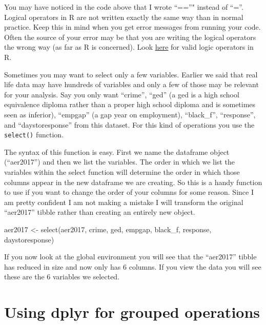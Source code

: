 \documentclass[
]{book}
\newenvironment{Shaded}{\begin{snugshade}}{\end{snugshade}}
\newcommand{\FunctionTok}[1]{\textcolor[rgb]{0.00,0.00,0.00}{#1}}
\newcommand{\NormalTok}[1]{#1}
\newcommand{\OtherTok}[1]{\textcolor[rgb]{0.56,0.35,0.01}{#1}}
\begin{document}
You may have noticed in the code above that I wrote ``==''" instead of ``=''. Logical operators in R are not written exactly the same way than in normal practice. Keep this in mind when you get error messages from running your code. Often the source of your error may be that you are writing the logical operators the wrong way (as far as R is concerned). Look \href{https://www.statmethods.net/management/operators.html}{here} for valid logic operators in R.

Sometimes you may want to select only a few variables. Earlier we said that real life data may have hundreds of variables and only a few of those may be relevant for your analysis. Say you only want ``crime'', ``ged'' (a ged is a high school equivalence diploma rather than a proper high school diploma and is sometimes seen as inferior), ``empgap'' (a gap year on employment), ``black\_f'', ``response'', and ``daystoresponse'' from this dataset. For this kind of operations you use the \texttt{select()} function.

The syntax of this function is easy. First we name the dataframe object (``aer2017'') and then we list the variables. The order in which we list the variables within the select function will determine the order in which those columns appear in the new dataframe we are creating. So this is a handy function to use if you want to change the order of your columns for some reason. Since I am pretty confident I am not making a mistake I will transform the original ``aer2017'' tibble rather than creating an entirely new object.

\begin{Shaded}
\begin{Highlighting}[]
\NormalTok{aer2017 }\OtherTok{\textless{}{-}} \FunctionTok{select}\NormalTok{(aer2017, crime, ged, empgap, black\_f, response, daystoresponse)}
\end{Highlighting}
\end{Shaded}

If you now look at the global environment you will see that the ``aer2017'' tibble has reduced in size and now only has 6 columns. If you view the data you will see these are the 6 variables we selected.

\hypertarget{using-dplyr-for-grouped-operations}{%
\section{Using dplyr for grouped operations}\label{using-dplyr-for-grouped-operations}}
\end{document}

